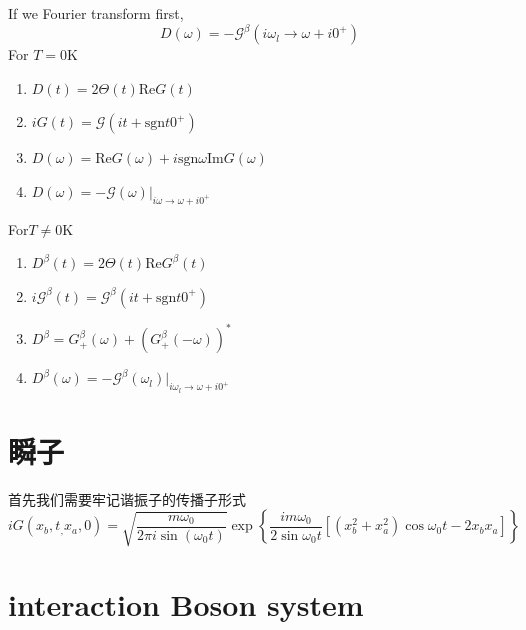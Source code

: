\documentclass[a4paper,11pt]{article}
\begin{document}
If we Fourier transform first,
\begin{equation*}
  D(\omega)=-\mathcal{G}^\beta(i\omega_l\rightarrow\omega+i0^+)
\end{equation*}
For $T=0$K
\begin{enumerate}
  \item $D(t)=2\Theta(t)\mathrm{Re}G(t)$
  \item $iG(t)=\mathcal{G}(it+\mathrm{sgn} t0^+)$
  \item $D(\omega)=\mathrm{Re}G(\omega)+i\mathrm{sgn}\omega\mathrm{Im}G(\omega)$
  \item $D(\omega)=-\mathcal{G}(\omega)|_{i\omega\to\omega+i0^+}$
\end{enumerate}
For$T\neq0$K
\begin{enumerate}
  \item $D^\beta(t)=2\Theta(t)\mathrm{Re}G^\beta(t)$
  \item $i\mathcal{G}^\beta(t)=\mathcal{G}^\beta(it+\mathrm{sgn}t0^+)$
  \item $D^\beta=G_+^\beta(\omega)+\left(G_+^\beta(-\omega)\right)^*$
  \item $D^\beta(\omega)=-\mathcal{G}^\beta(\omega_l)|_{i\omega_l\to\omega+i0^+}$
\end{enumerate}
\section{瞬子}
首先我们需要牢记谐振子的传播子形式
\begin{equation*}
  iG(x_b,t_,x_a,0)=\sqrt{\frac{m\omega_0}{2\pi i\sin(\omega_0t)}}\exp\left\{\frac{im\omega_0}{2\sin\omega_0t}[(x_b^2+x_a^2)\cos\omega_0t-2x_bx_a]\right\}
\end{equation*}
\section{interaction Boson system}
\end{document}
